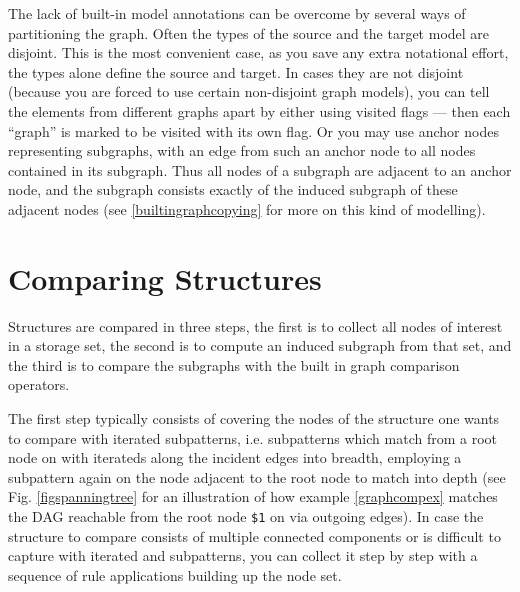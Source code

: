 The lack of built-in model annotations can be overcome by several ways of partitioning the graph. 
Often the types of the source and the target model are disjoint.
This is the most convenient case, as you save any extra notational effort, the types alone define the source and target.
In cases they are not disjoint (because you are forced to use certain non-disjoint graph models),
you can tell the elements from different graphs apart by either using visited flags --- then each ``graph'' is marked to be visited with its own flag.
Or you may use anchor nodes representing subgraphs, with an edge from such an anchor node to all nodes contained in its subgraph.
Thus all nodes of a subgraph are adjacent to an anchor node, and the subgraph consists exactly of the induced subgraph of these adjacent nodes (see \ref{builtingraphcopying} for more on this kind of modelling).


\section{Comparing Structures}\label{subsub:comparestructure}
Structures are compared in three steps, the first is to collect all nodes of interest in a storage set, the second is to compute an induced subgraph from that set, and the third is to compare the subgraphs with the built in graph comparison operators.

The first step typically consists of covering the nodes of the structure one wants to compare with iterated subpatterns,
i.e. subpatterns which match from a root node on with iterateds along the incident edges into breadth,
employing a subpattern again on the node adjacent to the root node to match into depth (see Fig. \ref{figspanningtree} for an illustration of how example \ref{graphcompex} matches the DAG reachable from the root node \verb#$1# on via outgoing edges).
In case the structure to compare consists of multiple connected components or is difficult to capture with iterated and subpatterns, you can collect it step by step with a sequence of rule applications building up the node set.

